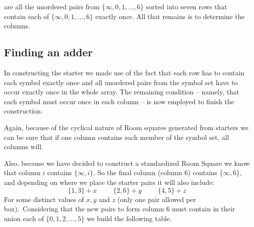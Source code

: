 \documentclass[
  11pt,
  a4paper]{book}
\begin{document}
are all the unordered pairs from \(\{\infty, 0, 1, \ldots, 6\}\)
sorted into seven rows that contain each of
\(\{\infty, 0, 1, \ldots, 6\}\) exactly once. All that remains is to
determine the columns.

\hypertarget{finding-an-adder}{%
\subsection{Finding an adder}\label{finding-an-adder}}

In constructing the starter we made use of the fact that
each row has to contain each symbol exactly once and all
unordered pairs from the symbol set have to occur exactly
once in the whole array. The remaining condition -- namely,
that each symbol must occur once in each column -- is now
employed to finish the construction.

Again, because of the cyclical nature of Room squares
generated from starters we can be sure that if one column
contains each member of the symbol set, all columns will.

Also, because we have decided to construct a standardized
Room Square we know that column \(i\) contains \(\{\infty,i\}\).
So the final column (column 6) contains \(\{\infty,6\}\), and
depending on where we place the starter pairs it will also
include: \[\{1,3\}+x \hspace{1cm} \{2,6\}+y \hspace{1cm}
\{4,5\}+z\] For some distinct values of \(x,y\) and \(z\) (only
one pair allowed per box).~Considering that the new pairs
to form column 6 must contain in their union each of
\(\{0,1,2,...,5\}\) we build the following table.
\end{document}

